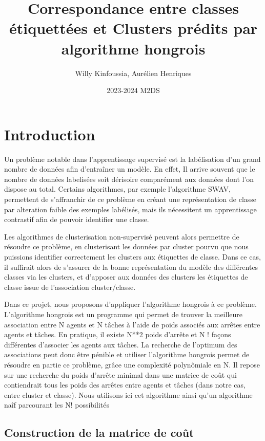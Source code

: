 \documentclass[
]{article}
\title{Correspondance entre classes étiquettées et Clusters prédits par
algorithme hongrois}
\author{Willy Kinfoussia, Aurélien Henriques}
\date{2023-2024 M2DS}
\begin{document}
\maketitle

\hypertarget{introduction}{%
\section{Introduction}\label{introduction}}

Un problème notable dans l'apprentissage supervisé est la labélisation
d'un grand nombre de données afin d'entraîner un modèle. En effet, Il
arrive souvent que le nombre de données labelisées soit dérisoire
comparément aux données dont l'on dispose au total. Certains
algorithmes, par exemple l'algorithme SWAV, permettent de s'affranchir
de ce problème en créant une représentation de classe par alteration
faible des exemples labélisés, mais ils nécessitent un apprentissage
contrastif afin de pouvoir identifier une classe.

Les algorithmes de clusterisation non-supervisé peuvent alors permettre
de résoudre ce problème, en clusterisant les données par cluster pourvu
que nous puissions identifier correctement les clusters aux étiquettes
de classe. Dans ce cas, il suffirait alors de s'assurer de la bonne
représentation du modèle des différentes classes via les clusters, et
d'apposer aux données des clusters les étiquettes de classe issue de
l'association cluster/classe.

Dans ce projet, nous proposons d'appliquer l'algorithme hongrois à ce
problème. L'algorithme hongrois est un programme qui permet de trouver
la meilleure association entre N agents et N tâches à l'aide de poids
associés aux arrêtes entre agents et tâches. En pratique, il existe N**2
poids d'arrête et N ! façons différentes d'associer les agents aux
tâches. La recherche de l'optimum des associations peut donc être
pénible et utiliser l'algorithme hongrois permet de résoudre en partie
ce problème, grâce une complexité polynômiale en N. Il repose sur une
recherche du poids d'arrête minimal dans une matrice de coût qui
contiendrait tous les poids des arrêtes entre agents et tâches (dans
notre cas, entre cluster et classe). Nous utilisons ici cet algorithme
ainsi qu'un algorithme naîf parcourant les N! possibilités

\hypertarget{construction-de-la-matrice-de-couxfbt}{%
\subsection{Construction de la matrice de
coût}\label{construction-de-la-matrice-de-couxfbt}}
\end{document}
